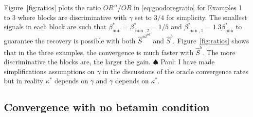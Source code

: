 \documentclass[
  12pt]{article}
\newcommand{\paul}[1]{{\small{\color{green} \sf $\spadesuit$ Paul: #1}}}
\begin{document}
Figure~\ref{fig:ratios} plots the ratio ${OR}^{ei}/OR$ in \eqref{eq:goodoregratio} for Examples 1 to 3 where blocks are discriminative with $\gamma$ set to $3/4$ for simplicity. The smallest signals in each block are such that $\beta_{\min }^*=\beta_{\min,2}^*=1/5$ and $\beta_{\min,1}^*=1.3\beta_{\min }^*$ to guarantee the recovery is possible with both $\hat{S}^{sd}^{sd}$ and $\hat S^b$. Figure~\ref{fig:ratios} shows that in the three examples, the convergence is much faster with $\hat S^b$. The more discriminative the blocks are, the larger the gain.
\paul{I have made simplifications assumptions on $\gamma$ in the discussions of the oracle convergence rates but in reality $\kappa^*$ depends on $\gamma$ and $\gamma$ depends on $\kappa^*$.}

\subsection{Convergence with no betamin condition}\label{ssec:nobetaminhyp}
\end{document}
